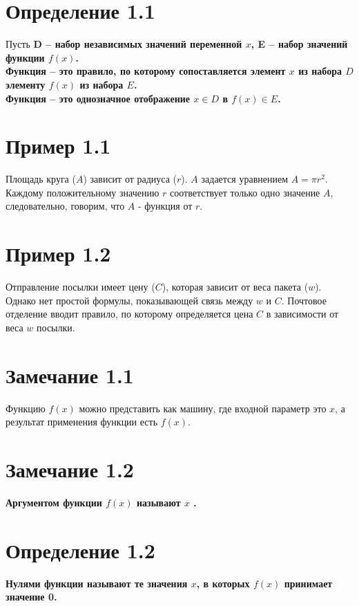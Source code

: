 \documentclass[a4paper,14pt]{report}
\begin{document}
\section*{ Определение 1.1}
\noindent
Пусть \bf{D} \rm -- набор независимых значений переменной $x$, \bf{E} \rm -- набор значений функции $f(x)$.\\
\bf Функция \rm -- это правило, по которому сопоставляется элемент $x$ из набора $D$ элементу $f(x)$ из набора $E$. \\
\bf Функция \rm -- это однозначное отображение $x \in D$ в $f(x) \in E$.


\section*{ Пример 1.1}
Площадь круга ($A$) зависит от радиуса ($r$). $A$ задается уравнением $A = \pi r^2$. Каждому положительному значению $r$ соответствует только одно значение $A$, следовательно, говорим, что $A$ - функция от $r$.

\section*{ Пример 1.2}
Отправление посылки имеет цену ($C$), которая зависит от веса пакета ($w$). Однако нет простой формулы, показывающей связь между $w$ и $C$. Почтовое отделение вводит правило, по которому определяется цена $C$ в зависимости от веса $w$ посылки.

\section*{ Замечание 1.1}
Функцию $f(x)$ можно представить как машину, где входной параметр это $x$, а результат применения функции есть $f(x)$. 

\section*{ Замечание 1.2}
\bf Аргументом \rm функции $f(x)$ называют $x$ .

\section*{ Определение 1.2}
\bf Нулями \rm функции называют те значения $x$, в которых $f(x)$ принимает значение 0.
\end{document}
